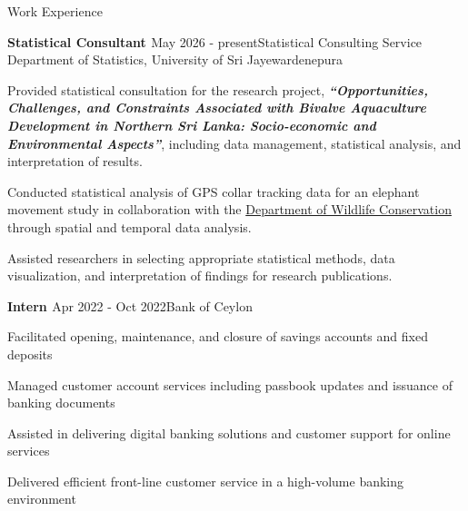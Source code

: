 \documentclass{resume} %
\begin{document}
	\begin{rSection}{Work Experience}
		
		\begin{rSubsection}{\bf Statistical Consultant \href{https://science.sjp.ac.lk/sta/scs-usj/}{\faExternalLink}}{May 2026 - present}{Statistical Consulting Service \\ Department of Statistics, University of Sri Jayewardenepura }{}
			\item Provided statistical consultation for the research project, \textbf{\emph{``Opportunities, Challenges, and Constraints Associated with Bivalve Aquaculture Development in Northern Sri Lanka: Socio-economic and Environmental Aspects''}}, including data management, statistical analysis, and interpretation of results.
			\item Conducted statistical analysis of GPS collar tracking data for an elephant movement study in collaboration with the {\hypersetup{urlcolor=blue}\href{https://www.dwc.gov.lk/}{Department of Wildlife Conservation}} through spatial and temporal data analysis.
			\item Assisted researchers in selecting appropriate statistical methods, data visualization, and interpretation of findings for research publications.
		\end{rSubsection}
		
		\begin{rSubsection}{\bf Intern \href{https://github.com/amalirajapaksha/CV/blob/main/Intern_BOC.jpeg}{\faExternalLink}}{Apr 2022 - Oct 2022}{Bank of Ceylon}{}
			\item Facilitated opening, maintenance, and closure of savings accounts and fixed deposits
			\item Managed customer account services including passbook updates and issuance of banking documents
			\item Assisted in delivering digital banking solutions and customer support for online services
			\item Delivered efficient front-line customer service in a high-volume banking environment
		\end{rSubsection}
		
	\end{rSection}
	
	\hypersetup{
		colorlinks=true,
		linkcolor=blue,
		urlcolor=blue
	}
	
	
\end{document}
